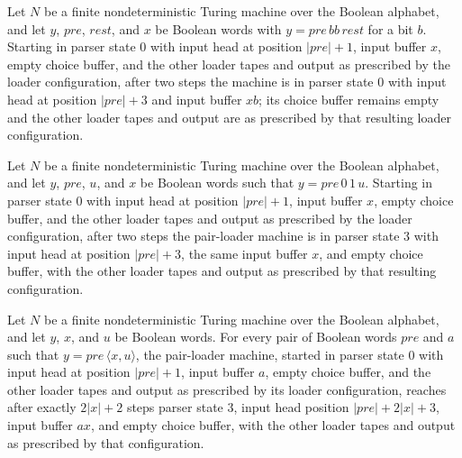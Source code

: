 \begin{lemma}
\label{Complexity.cont_parse_double}
\leanok
{}
Let $N$ be a finite nondeterministic Turing machine over the Boolean alphabet, and let
$y$, $pre$, $rest$, and $x$ be Boolean words with $y=pre \, b b \, rest$ for a bit $b$.
Starting in parser state $0$ with input head at position $|pre|+1$, input buffer $x$,
empty choice buffer, and the other loader tapes and output as prescribed by the loader
configuration, after two steps the machine is in parser state $0$ with input head at
position $|pre|+3$ and input buffer $x b$; its choice buffer remains empty and the other
loader tapes and output are as prescribed by that resulting loader configuration.
\end{lemma}

\begin{lemma}
\label{Complexity.cont_parse_separator}
\leanok
{}
Let $N$ be a finite nondeterministic Turing machine over the Boolean alphabet, and let
$y$, $pre$, $u$, and $x$ be Boolean words such that $y=pre\,0\,1\,u$. Starting in parser
state $0$ with input head at position $|pre|+1$, input buffer $x$, empty choice buffer,
and the other loader tapes and output as prescribed by the loader configuration, after
two steps the pair-loader machine is in parser state $3$ with input head at position
$|pre|+3$, the same input buffer $x$, and empty choice buffer, with the other loader
tapes and output as prescribed by that resulting configuration.
\end{lemma}

\begin{lemma}
\label{Complexity.cont_parse_run}
\leanok
{}
Let $N$ be a finite nondeterministic Turing machine over the Boolean alphabet, and let
$y$, $x$, and $u$ be Boolean words. For every pair of Boolean words $pre$ and $a$ such
that $y=pre\,\langle x,u\rangle$, the pair-loader machine, started in parser state $0$
with input head at position $|pre|+1$, input buffer $a$, empty choice buffer, and the
other loader tapes and output as prescribed by its loader configuration, reaches after
exactly $2|x|+2$ steps parser state $3$, input head position $|pre|+2|x|+3$, input
buffer $ax$, and empty choice buffer, with the other loader tapes and output as
prescribed by that configuration.
\end{lemma}

